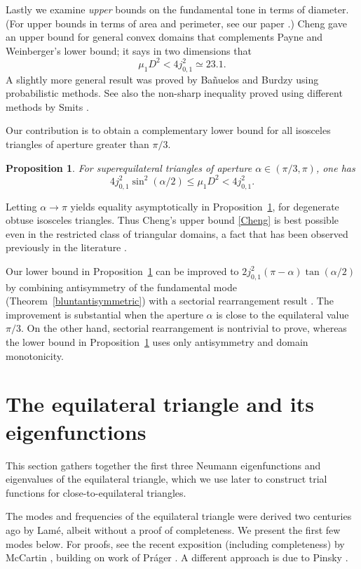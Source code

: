 \documentclass[11pt,reqno]{amsart}
\newtheorem{proposition}[theorem]{Proposition}
\numberwithin{equation}{section}
\begin{document}
\medskip Lastly we examine \textit{upper} bounds on the fundamental tone in terms of diameter. (For upper bounds in terms of area and perimeter, see our paper \cite{LS09a}.) Cheng \cite[Theorem~2.1]{cheng} gave an upper bound for general convex domains
that complements Payne and Weinberger's lower bound; it says in two
dimensions that
\begin{equation} \label{Cheng}
  \mu_1 D^2 < 4j_{0,1}^2 \simeq 23.1.
\end{equation}
A slightly more general result was proved by Ba\~nuelos and Burdzy
\cite[Proposition 2.2]{BaBu} using probabilistic methods. See also
the non-sharp inequality proved using different methods by Smits
\cite[Theorem~4]{S96}.

Our contribution is to obtain a complementary lower bound for all
isosceles triangles of aperture greater than $\pi/3$.
\begin{proposition}\label{1D}
For superequilateral triangles of aperture $\alpha \in (\pi/3,\pi)$, one has
\[
    4j_{0,1}^2 \sin^2(\alpha/2) \leq \mu_1 D^2< 4j_{0,1}^2.
\]
\end{proposition}
Letting $\alpha \to \pi$ yields equality asymptotically in Proposition~\ref{1D}, for degenerate obtuse isosceles triangles. Thus Cheng's upper bound \eqref{Cheng} is best possible even in the restricted class of triangular domains, a fact that has been observed previously in the literature \cite[p.~10]{BaBu}.

Our lower bound in Proposition~\ref{1D} can be improved to $2j_{0,1}^2 (\pi-\alpha) \tan(\alpha/2)$ by combining antisymmetry of the fundamental mode (Theorem~\ref{bluntantisymmetric}) with a sectorial rearrangement result \cite[p.~114]{B79}. The improvement is substantial when the aperture $\alpha$ is close to the equilateral value $\pi/3$. On the other hand, sectorial rearrangement is nontrivial to prove, whereas the lower bound in Proposition~\ref{1D} uses only antisymmetry and domain monotonicity.

\section{\bf The equilateral triangle and its eigenfunctions} \label{equilateral}

This section gathers together the first three Neumann eigenfunctions
and eigenvalues of the equilateral triangle, which we use later to
construct trial functions for close-to-equilateral triangles.

The modes and frequencies of the equilateral triangle were derived
two centuries ago by Lam\'{e}, albeit without a proof of
completeness. We present the first few modes below. For proofs,
see the recent exposition (including completeness) by McCartin
\cite{M02}, building on work of Pr\'{a}ger \cite{Pr98}. A
different approach is due to Pinsky \cite{Pi80}.
\end{document}
